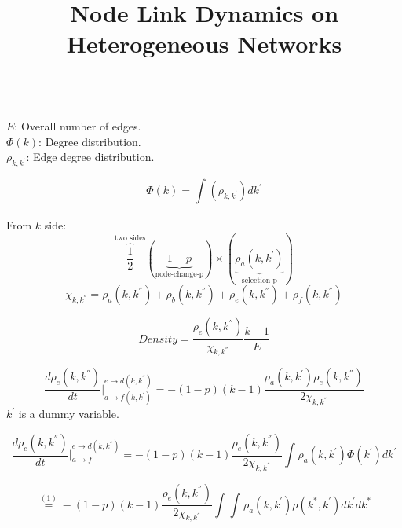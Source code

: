 \documentclass[11pt,a4paper]{article}
\title{\textbf{Node Link Dynamics on Heterogeneous Networks}}
\date{}
\begin{document}
\maketitle


~\\
$E$: Overall number of edges.\\
$\Phi(k)$: Degree distribution.\\
$\rho_{k,k^{'}}$: Edge degree distribution.

\begin{equation}
\Phi(k) = \int_{}^{ }( \rho_{k,k^{'}} ) dk^{'}
\end{equation}

From $k$ side:
\begin{equation}
\overbrace{\frac{1}{2}}^\text{two sides}
(\underbrace{1-p}_\textrm{node-change-p}) \times (\underbrace{\rho_a(k,k^{'})}_\textrm{selection-p} )
\end{equation}
\begin{equation}
\chi_{k, k^{''}} = { \rho_{a}(k,k^{''}) + \rho_{b}(k,k^{''}) + \rho_{e}(k,k^{''}) + \rho_{f}(k,k^{''})}
\end{equation}

\begin{equation}
Density = \frac{ \rho_{e}(k,k^{''}) }
{ \chi_{k, k^{''}}}
\frac{k-1}{E}
\end{equation}

\begin{equation}
\frac{d\rho_e(k,k^{''})}
{dt}
|{}_
{a\rightarrow f(k,k^{'})}^{e\rightarrow d(k,k^{''})}
= -(1-p)(k-1)
\frac
{\rho_a(k,k^{'})\rho_{e}(k,k^{''})}
{2\chi_{k, k^{''}}}
\end{equation}
$k^{'}$ is a dummy variable.

\begin{equation}
\frac{d\rho_e(k,k^{''})}
{dt}
|{}_
{a\rightarrow f}^{e\rightarrow d(k,k^{''})}
= -(1-p)(k-1)
\frac
{\rho_{e}(k,k^{''})}
{2\chi_{k, k^{''}}}
\int_{}^{ }
{\rho_a(k,k^{'})\Phi(k^{'})}
dk^{'}
\end{equation}

\begin{equation}
 \overset{(1)}{=}
-(1-p)(k-1)
\frac
{\rho_{e}(k,k^{''})}
{2\chi_{k, k^{''}}}
\int_{}^{ }
\int_{}^{ }
\rho_a(k,k^{'})
\rho(k^{*},k^{'})
dk^{'}
dk^{*}
\end{equation}
\end{document}
